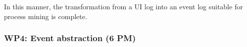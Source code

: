 In this manner, the transformation from a UI log into an event log suitable for process mining is complete.

%
%
%



\subsubsection{WP4: Event abstraction (6 PM)}
\label{sec:wp4}

